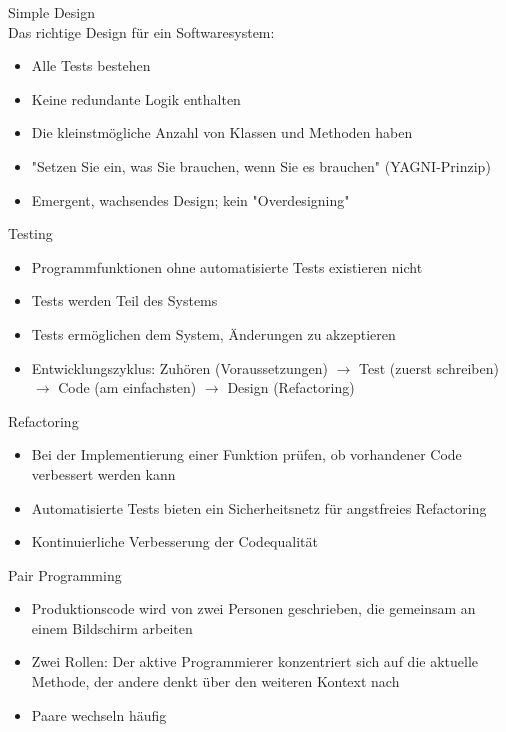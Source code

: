 \begin{concept}{Simple Design}\\
    Das richtige Design für ein Softwaresystem:
    \begin{itemize}
        \item Alle Tests bestehen
        \item Keine redundante Logik enthalten
        \item Die kleinstmögliche Anzahl von Klassen und Methoden haben
        \item "Setzen Sie ein, was Sie brauchen, wenn Sie es brauchen" (YAGNI-Prinzip)
        \item Emergent, wachsendes Design; kein "Overdesigning"
    \end{itemize}
\end{concept}

\begin{concept}{Testing}\\
    \begin{itemize}
        \item Programmfunktionen ohne automatisierte Tests existieren nicht
        \item Tests werden Teil des Systems
        \item Tests ermöglichen dem System, Änderungen zu akzeptieren
        \item Entwicklungszyklus: Zuhören (Voraussetzungen) $\rightarrow$ Test (zuerst schreiben) $\rightarrow$ Code (am einfachsten) $\rightarrow$ Design (Refactoring)
    \end{itemize}
\end{concept}

\begin{concept}{Refactoring}\\
    \begin{itemize}
        \item Bei der Implementierung einer Funktion prüfen, ob vorhandener Code verbessert werden kann
        \item Automatisierte Tests bieten ein Sicherheitsnetz für angstfreies Refactoring
        \item Kontinuierliche Verbesserung der Codequalität
    \end{itemize}
\end{concept}

\begin{concept}{Pair Programming}\\
    \begin{itemize}
        \item Produktionscode wird von zwei Personen geschrieben, die gemeinsam an einem Bildschirm arbeiten
        \item Zwei Rollen: Der aktive Programmierer konzentriert sich auf die aktuelle Methode, der andere denkt über den weiteren Kontext nach
        \item Paare wechseln häufig
    \end{itemize}
\end{concept}

